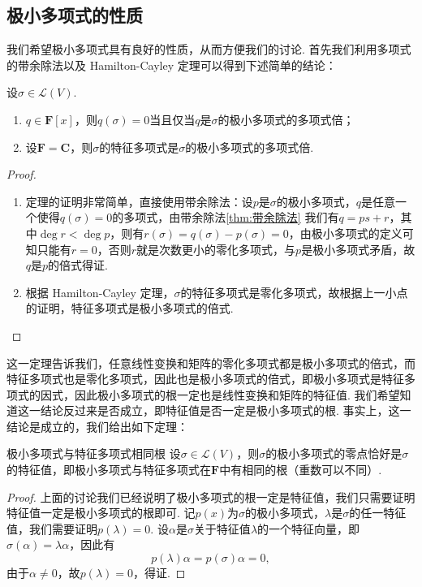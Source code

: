 \subsection{极小多项式的性质}

我们希望极小多项式具有良好的性质，从而方便我们的讨论. 首先我们利用多项式的带余除法以及 Hamilton-Cayley 定理可以得到下述简单的结论：
\begin{theorem}{}{}
    设$\sigma\in \mathcal{L}(V)$.
    \begin{enumerate}
        \item $q\in\mathbf{F}[x]$，则$q(\sigma)=0$当且仅当$q$是$\sigma$的极小多项式的多项式倍；

        \item 设$\mathbf{F}=\mathbf{C}$，则$\sigma$的特征多项式是$\sigma$的极小多项式的多项式倍.
    \end{enumerate}
\end{theorem}

\begin{proof}
    \begin{enumerate}
        \item 定理的证明非常简单，直接使用带余除法：设$p$是$\sigma$的极小多项式，$q$是任意一个使得$q(\sigma)=0$的多项式，由带余除法\autoref{thm:带余除法} 我们有$q=ps+r$，其中$\deg r<\deg p$，则有$r(\sigma)=q(\sigma)-p(\sigma)=0$，由极小多项式的定义可知只能有$r=0$，否则$r$就是次数更小的零化多项式，与$p$是极小多项式矛盾，故$q$是$p$的倍式得证.

        \item 根据 Hamilton-Cayley 定理，$\sigma$的特征多项式是零化多项式，故根据上一小点的证明，特征多项式是极小多项式的倍式.
    \end{enumerate}
\end{proof}

这一定理告诉我们，任意线性变换和矩阵的零化多项式都是极小多项式的倍式，而特征多项式也是零化多项式，因此也是极小多项式的倍式，即极小多项式是特征多项式的因式，因此极小多项式的根一定也是线性变换和矩阵的特征值. 我们希望知道这一结论反过来是否成立，即特征值是否一定是极小多项式的根. 事实上，这一结论是成立的，我们给出如下定理：
\begin{theorem}{}{极小多项式与特征多项式相同根}
    设$\sigma\in \mathcal{L}(V)$，则$\sigma$的极小多项式的零点恰好是$\sigma$的特征值，即极小多项式与特征多项式在$\mathbf{F}$中有相同的根（重数可以不同）.
\end{theorem}

\begin{proof}
    上面的讨论我们已经说明了极小多项式的根一定是特征值，我们只需要证明特征值一定是极小多项式的根即可. 记$p(x)$为$\sigma$的极小多项式，$\lambda$是$\sigma$的任一特征值，我们需要证明$p(\lambda)=0$. 设$\alpha$是$\sigma$关于特征值$\lambda$的一个特征向量，即$\sigma(\alpha)=\lambda\alpha$，因此有
    \[p(\lambda)\alpha=p(\sigma)\alpha=0,\]
    由于$\alpha\neq 0$，故$p(\lambda)=0$，得证.
\end{proof}

